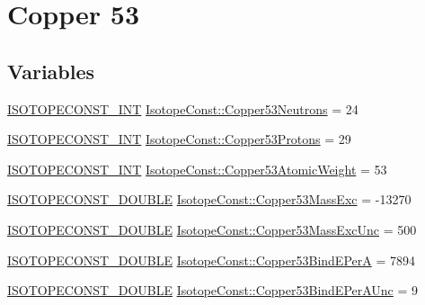 \hypertarget{group___isotope_const-_copper-_cu53}{}\section{Copper 53}
\label{group___isotope_const-_copper-_cu53}
\subsection*{Variables}
\begin{DoxyCompactItemize}
\item 
\mbox{\hyperlink{group___isotope_const-_macros_ga5f18360b3e99483a35c32d789e62621c}{I\+S\+O\+T\+O\+P\+E\+C\+O\+N\+S\+T\+\_\+\+I\+NT}} \mbox{\hyperlink{group___isotope_const-_copper-_cu53_ga6fc643ff64812c6a11ae6a38c3fc6156}{Isotope\+Const\+::\+Copper53\+Neutrons}} = 24
\item 
\mbox{\hyperlink{group___isotope_const-_macros_ga5f18360b3e99483a35c32d789e62621c}{I\+S\+O\+T\+O\+P\+E\+C\+O\+N\+S\+T\+\_\+\+I\+NT}} \mbox{\hyperlink{group___isotope_const-_copper-_cu53_gaf10d5da38e687f5d1d2cf6f2da9ad62c}{Isotope\+Const\+::\+Copper53\+Protons}} = 29
\item 
\mbox{\hyperlink{group___isotope_const-_macros_ga5f18360b3e99483a35c32d789e62621c}{I\+S\+O\+T\+O\+P\+E\+C\+O\+N\+S\+T\+\_\+\+I\+NT}} \mbox{\hyperlink{group___isotope_const-_copper-_cu53_gad7386dcdbc5ffc5fdb13c001ce626f03}{Isotope\+Const\+::\+Copper53\+Atomic\+Weight}} = 53
\item 
\mbox{\hyperlink{group___isotope_const-_macros_ga8f45a7272ce02c0b4c65c44636ed719a}{I\+S\+O\+T\+O\+P\+E\+C\+O\+N\+S\+T\+\_\+\+D\+O\+U\+B\+LE}} \mbox{\hyperlink{group___isotope_const-_copper-_cu53_gab3c33ca7c164b436fbfc36dccc948ac1}{Isotope\+Const\+::\+Copper53\+Mass\+Exc}} = -\/13270
\item 
\mbox{\hyperlink{group___isotope_const-_macros_ga8f45a7272ce02c0b4c65c44636ed719a}{I\+S\+O\+T\+O\+P\+E\+C\+O\+N\+S\+T\+\_\+\+D\+O\+U\+B\+LE}} \mbox{\hyperlink{group___isotope_const-_copper-_cu53_gae737f8b9c511a253353d0537cb436ed8}{Isotope\+Const\+::\+Copper53\+Mass\+Exc\+Unc}} = 500
\item 
\mbox{\hyperlink{group___isotope_const-_macros_ga8f45a7272ce02c0b4c65c44636ed719a}{I\+S\+O\+T\+O\+P\+E\+C\+O\+N\+S\+T\+\_\+\+D\+O\+U\+B\+LE}} \mbox{\hyperlink{group___isotope_const-_copper-_cu53_ga136c69b879808d7da36a08fa79b6fc70}{Isotope\+Const\+::\+Copper53\+Bind\+E\+PerA}} = 7894
\item 
\mbox{\hyperlink{group___isotope_const-_macros_ga8f45a7272ce02c0b4c65c44636ed719a}{I\+S\+O\+T\+O\+P\+E\+C\+O\+N\+S\+T\+\_\+\+D\+O\+U\+B\+LE}} \mbox{\hyperlink{group___isotope_const-_copper-_cu53_ga11c4fa376f9a1992373661884e07637b}{Isotope\+Const\+::\+Copper53\+Bind\+E\+Per\+A\+Unc}} = 9

\end{DoxyCompactItemize}
